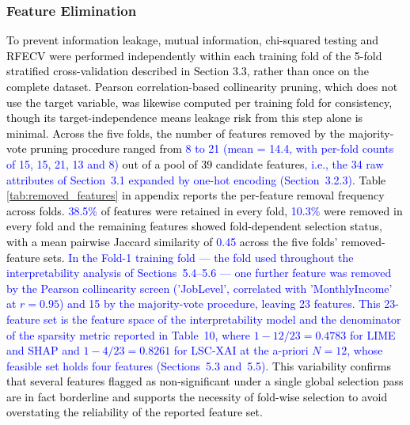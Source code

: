 \documentclass[a4paper,fleqn]{cas-sc}
\begin{document}
\subsubsection{Feature Elimination}
\textcolor{black}{To prevent information leakage, mutual information, chi-squared testing and RFECV were performed independently within each training fold of the 5-fold stratified cross-validation described in Section 3.3, rather than once on the complete dataset. Pearson correlation-based collinearity pruning, which does not use the target variable, was likewise computed per training fold for consistency, though its target-independence means leakage risk from this step alone is minimal. Across the five folds, the number of features removed by the majority-vote pruning procedure ranged from \textcolor{blue}{8 to 21 (mean = 14.4, with per-fold counts of 15, 15, 21, 13 and 8)} out of a pool of 39 candidate features\textcolor{blue}{, i.e., the 34 raw attributes of Section~3.1 expanded by one-hot encoding (Section~3.2.3)}. Table \ref{tab:removed_features} in appendix reports the per-feature removal frequency across folds. \textcolor{blue}{38.5\%} of features were retained in every fold, \textcolor{blue}{10.3\%} were removed in every fold and the remaining features showed fold-dependent selection status, with a mean pairwise Jaccard similarity of \textcolor{blue}{0.45} across the five folds' removed-feature sets. \textcolor{blue}{In the Fold-1 training fold --- the fold used throughout the interpretability analysis of Sections~5.4--5.6 --- one further feature was removed by the Pearson collinearity screen ('JobLevel', correlated with 'MonthlyIncome' at $r = 0.95$) and 15 by the majority-vote procedure, leaving 23 features. This 23-feature set is the feature space of the interpretability model and the denominator of the sparsity metric reported in Table~10, where $1 - 12/23 = 0.4783$ for LIME and SHAP and $1 - 4/23 = 0.8261$ for LSC-XAI at the a-priori $N = 12$, whose feasible set holds four features (Sections~5.3 and~5.5).} This variability confirms that several features flagged as non-significant under a single global selection pass are in fact borderline and supports the necessity of fold-wise selection to avoid overstating the reliability of the reported feature set.}
\end{document}
